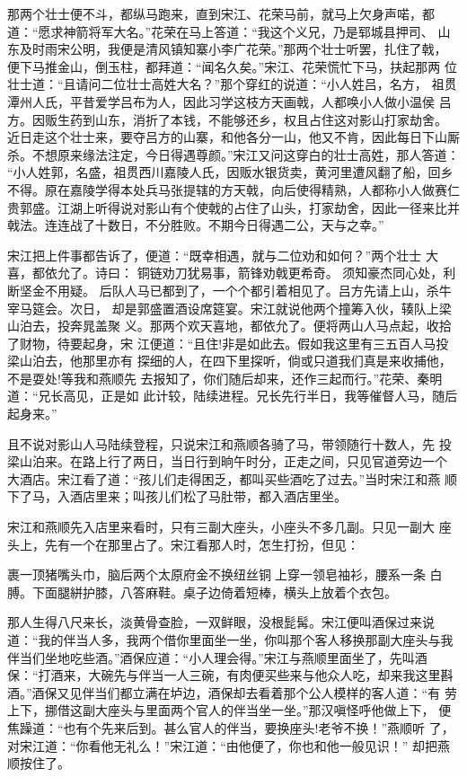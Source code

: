 那两个壮士便不斗，都纵马跑来，直到宋江、花荣马前，就马上欠身声喏，都
道：“愿求神箭将军大名。”花荣在马上答道：“我这个义兄，乃是郓城县押司、
山东及时雨宋公明，我便是清风镇知寨小李广花荣。”那两个壮士听罢，扎住了戟，
便下马推金山，倒玉柱，都拜道：“闻名久矣。”宋江、花荣慌忙下马，扶起那两
位壮士道：“且请问二位壮士高姓大名？”那个穿红的说道：“小人姓吕，名方，
祖贯潭州人氏，平昔爱学吕布为人，因此习学这枝方天画戟，人都唤小人做小温侯
吕方。因贩生药到山东，消折了本钱，不能够还乡，权且占住这对影山打家劫舍。
近日走这个壮士来，要夺吕方的山寨，和他各分一山，他又不肯，因此每日下山厮
杀。不想原来缘法注定，今日得遇尊颜。”宋江又问这穿白的壮士高姓，那人答道：
“小人姓郭，名盛，祖贯西川嘉陵人氏，因贩水银货卖，黄河里遭风翻了船，回乡
不得。原在嘉陵学得本处兵马张提辖的方天戟，向后使得精熟，人都称小人做赛仁
贵郭盛。江湖上听得说对影山有个使戟的占住了山头，打家劫舍，因此一径来比并
戟法。连连战了十数日，不分胜败。不期今日得遇二公，天与之幸。”

宋江把上件事都告诉了，便道：“既幸相遇，就与二位劝和如何？”两个壮士
大喜，都依允了。诗曰：
铜链劝刀犹易事，箭锋劝戟更希奇。
须知豪杰同心处，利断坚金不用疑。
后队人马已都到了，一个个都引着相见了。吕方先请上山，杀牛宰马筵会。次日，
却是郭盛置酒设席筵宴。宋江就说他两个撞筹入伙，辏队上梁山泊去，投奔晁盖聚
义。那两个欢天喜地，都依允了。便将两山人马点起，收拾了财物，待要起身，宋
江便道：“且住!非是如此去。假如我这里有三五百人马投梁山泊去，他那里亦有
探细的人，在四下里探听，倘或只道我们真是来收捕他，不是耍处!等我和燕顺先
去报知了，你们随后却来，还作三起而行。”花荣、秦明道：“兄长高见，正是如
此计较，陆续进程。兄长先行半日，我等催督人马，随后起身来。”

且不说对影山人马陆续登程，只说宋江和燕顺各骑了马，带领随行十数人，先
投梁山泊来。在路上行了两日，当日行到晌午时分，正走之间，只见官道旁边一个
大酒店。宋江看了道：“孩儿们走得困乏，都叫买些酒吃了过去。”当时宋江和燕
顺下了马，入酒店里来；叫孩儿们松了马肚带，都入酒店里坐。

宋江和燕顺先入店里来看时，只有三副大座头，小座头不多几副。只见一副大
座头上，先有一个在那里占了。宋江看那人时，怎生打扮，但见：

裹一顶猪嘴头巾，脑后两个太原府金不换纽丝铜上穿一领皂袖衫，腰系一条
白膊。下面腿絣护膝，八答麻鞋。桌子边倚着短棒，横头上放着个衣包。

那人生得八尺来长，淡黄骨查脸，一双鲜眼，没根髭髯。宋江便叫酒保过来说
道：“我的伴当人多，我两个借你里面坐一坐，你叫那个客人移换那副大座头与我
伴当们坐地吃些酒。”酒保应道：“小人理会得。”宋江与燕顺里面坐了，先叫酒
保：“打酒来，大碗先与伴当一人三碗，有肉便买些来与他众人吃，却来我这里斟
酒。”酒保又见伴当们都立满在垆边，酒保却去看着那个公人模样的客人道：“有
劳上下，挪借这副大座头与里面两个官人的伴当坐一坐。”那汉嗔怪呼他做上下，
便焦躁道：“也有个先来后到。甚么官人的伴当，要换座头!老爷不换！”燕顺听
了，对宋江道：“你看他无礼么！”宋江道：“由他便了，你也和他一般见识！”
却把燕顺按住了。

